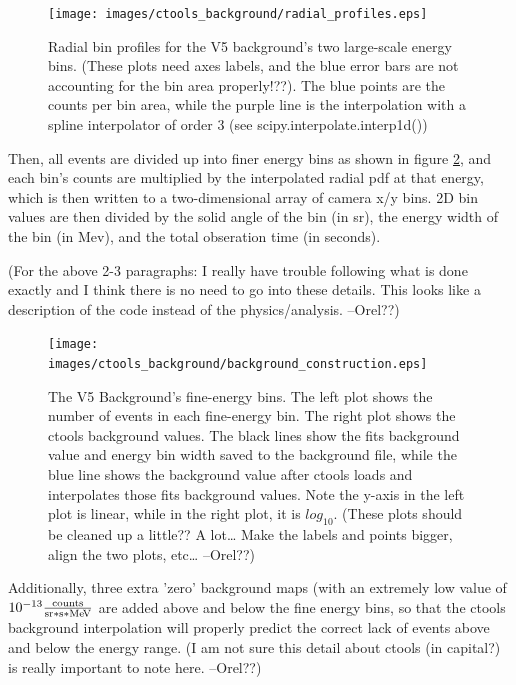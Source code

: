 \begin{figure}[ht]
  \begin{center}
    \texttt{[image: images/ctools\_background/radial\_profiles.eps]}
    \caption[CTOOLS Radial Background Profiles]{Radial bin profiles for the V5 background's two large-scale energy bins.  (These plots need axes labels, and the blue error bars are not accounting for the bin area properly!??).  The blue points are the counts per bin area, while the purple line is the interpolation with a spline interpolator of order 3 (see scipy.interpolate.interp1d())}\label{fig:background_radial}
  \end{center}
\end{figure}


Then, all events are divided up into  finer energy bins as shown in figure \ref{fig:background_profile}, and each bin's counts are multiplied by the interpolated radial pdf at that energy, which is then written to a two-dimensional array of camera x/y bins.
2D bin values are then divided by the solid angle of the bin (in sr), the energy width of the bin (in Mev), and the total obseration time (in seconds).

(For the above 2-3 paragraphs: I really have trouble following what is done exactly and I think there is no need to go into these details. This looks like a description of the code instead of the physics/analysis. --Orel??)

\begin{figure}[ht]
  \begin{center}
    \texttt{[image: images/ctools\_background/background\_construction.eps]}
    \caption[CTOOLS Background Fine Energy Bins]{The V5 Background's fine-energy bins.  The left plot shows the number of events in each fine-energy bin.  The right plot shows the ctools background values.  The black lines show the fits background value and energy bin width saved to the background file, while the blue line shows the background value after ctools loads and interpolates those fits background values.  Note the y-axis in the left plot is linear, while in the right plot, it is $log_{10}$. (These plots should be cleaned up a little??  A lot… Make the labels and points bigger, align the two plots, etc… --Orel??)}\label{fig:background_profile}
  \end{center}
\end{figure}

Additionally, three extra 'zero' background maps (with an extremely low value of $10^{-13} \frac{\text{counts}}{\text{sr}*\text{s}*\MeV}$ are added above and below the fine energy bins, so that the ctools background interpolation will properly predict the correct lack of events above and below the energy range.
(I am not sure this detail about ctools (in capital?) is really important to note here. --Orel??)


